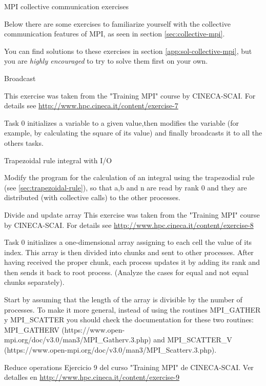  {MPI collective communication exercises}
\label{sec:collective-mpi-exercises}

Below there are some exercises to familiarize yourself with the collective communication features
of MPI, as seen in section \ref{sec:collective-mpi}.

You can find solutions to these exercises in section
\ref{app:sol-collective-mpi}, but you are \emph{highly encouraged} to try to
solve them first on your own.

 {Broadcast}
\label{ex:collective-mpi-broadcast}

This exercise was taken from the "Training MPI" course by CINECA-SCAI. For
details see \url{http://www.hpc.cineca.it/content/exercise-7} 

Task 0 initializes a variable to a given value,then modifies the variable (for
example, by calculating the square of its value) and finally broadcasts it to
all the others tasks.


 {Trapezoidal rule integral with I/O}
\label{ex:collective-mpi-trapezoidal-io}

Modify the program for the calculation of an integral using the trapezodial rule
(see \ref{sec:trapezoidal-rule}), so that a,b and n are read by rank 0 and they
are distributed (with collective calls) to the other processes.


 {Divide and update array}
\label{ex:collective-mpi-scatter}
This exercise was taken from the "Training MPI" course by CINECA-SCAI. For
details see \url{http://www.hpc.cineca.it/content/exercise-8} 

Task 0 initializes a one-dimensional array assigning to each cell the value of
its index. This array is then divided into chunks and sent to other
processes. After having received the proper chunk, each process updates it by
adding its rank and then sends it back to root process. (Analyze the cases for
equal and not equal chunks separately).

Start by assuming that the length of the array is divisible by the number of
processes. To make it more general, instead of using the routines MPI\_GATHER y
MPI\_SCATTER you should check the documentation for these two routines:
MPI\_GATHERV (https://www.open-mpi.org/doc/v3.0/man3/MPI\_Gatherv.3.php) and
MPI\_SCATTER\_V (https://www.open-mpi.org/doc/v3.0/man3/MPI\_Scatterv.3.php). 



 {Reduce operations}
\label{ex:collective-mpi-reduce}
Ejercicio 9 del curso "Training MPI" de CINECA-SCAI. Ver detalles en
\url{http://www.hpc.cineca.it/content/exercise-9}

